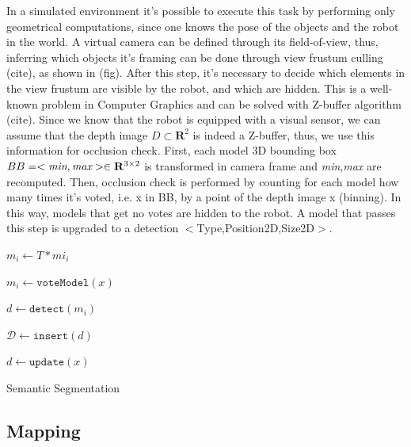 \documentclass{article}
\begin{document}
	In a simulated environment it's possible to execute this task by performing only geometrical computations, since one knows the pose of the objects and the robot in the world.	A virtual camera can be defined through its field-of-view, thus, inferring which objects it's framing can be done through view frustum culling (cite), as shown in (fig). After this step, it's necessary to decide which elements in the view frustum are visible by the robot, and which are hidden. This is a well-known problem in Computer Graphics and can be solved with Z-buffer algorithm (cite). Since we know that the robot is equipped with a visual sensor, we can assume that the depth image $D \subset \mathbf{R}^2$ is indeed a Z-buffer, thus, we use this information for occlusion check. First, each model 3D bounding box $BB = < \emph{min} ,\emph{max} > \in \mathbf{R}^{3 \times 2}$ is transformed in camera frame and \emph{min},\emph{max} are recomputed. Then, occlusion check is performed by counting for each model how many times it's voted, i.e. x in BB, by a point of the depth image x (binning). In this way, models that get no votes are hidden to the robot. A model that passes this step is upgraded to a detection $<$Type,Position2D,Size2D$>$. 
	
	\begin{center}
		\begin{algorithm}[H]
			{
				$m_i \leftarrow T \ast mi_i$
			}
			{
				$m_i \leftarrow \texttt{voteModel}(x)$
				
				{
					$d \leftarrow \texttt{detect}(m_i)$
					
					$\mathcal{D} \leftarrow \texttt{insert}(d)$
				}
				
				$d \leftarrow \texttt{update}(x)$
			}
		\caption{Semantic Segmentation}
		\end{algorithm}
	\end{center}
	
	\subsection*{Mapping}
	
\end{document}
